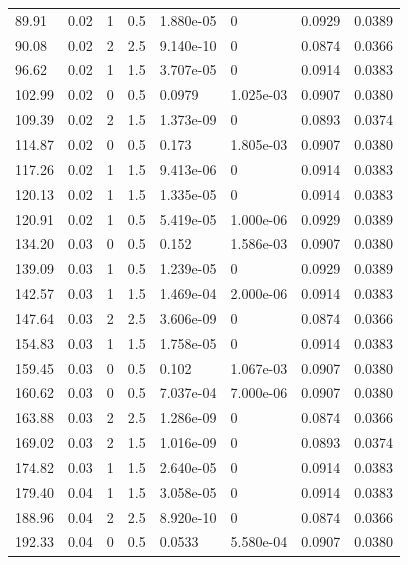 \documentclass[preview]{standalone}
\begin{document}
{{\begin{tabular}{L{1.2cm}C{1.2cm} C{0.3cm}C{0.5cm} C{1.4cm}C{1.4cm} C{1.4cm}C{1.4cm}}
  89.91  &  0.02  & 1     & 0.5 &  1.880e-05  & 0  & 0.0929 &  0.0389   \\ 
  90.08  &  0.02  & 2     & 2.5 &  9.140e-10  & 0  & 0.0874 &  0.0366   \\ 
  96.62  &  0.02  & 1     & 1.5 &  3.707e-05  & 0  & 0.0914 &  0.0383   \\ 
  102.99  &  0.02  & 0     & 0.5 &  0.0979  & 1.025e-03  & 0.0907 &  0.0380   \\ 
  109.39  &  0.02  & 2     & 1.5 &  1.373e-09  & 0  & 0.0893 &  0.0374   \\ 
  114.87  &  0.02  & 0     & 0.5 &  0.173  & 1.805e-03  & 0.0907 &  0.0380   \\ 
  117.26  &  0.02  & 1     & 1.5 &  9.413e-06  & 0  & 0.0914 &  0.0383   \\ 
  120.13  &  0.02  & 1     & 1.5 &  1.335e-05  & 0  & 0.0914 &  0.0383   \\ 
  120.91  &  0.02  & 1     & 0.5 &  5.419e-05  & 1.000e-06  & 0.0929 &  0.0389   \\ 
  134.20  &  0.03  & 0     & 0.5 &  0.152  & 1.586e-03  & 0.0907 &  0.0380   \\ 
  139.09  &  0.03  & 1     & 0.5 &  1.239e-05  & 0  & 0.0929 &  0.0389   \\ 
  142.57  &  0.03  & 1     & 1.5 &  1.469e-04  & 2.000e-06  & 0.0914 &  0.0383   \\ 
  147.64  &  0.03  & 2     & 2.5 &  3.606e-09  & 0  & 0.0874 &  0.0366   \\ 
  154.83  &  0.03  & 1     & 1.5 &  1.758e-05  & 0  & 0.0914 &  0.0383   \\ 
  159.45  &  0.03  & 0     & 0.5 &  0.102  & 1.067e-03  & 0.0907 &  0.0380   \\ 
  160.62  &  0.03  & 0     & 0.5 &  7.037e-04  & 7.000e-06  & 0.0907 &  0.0380   \\ 
  163.88  &  0.03  & 2     & 2.5 &  1.286e-09  & 0  & 0.0874 &  0.0366   \\ 
  169.02  &  0.03  & 2     & 1.5 &  1.016e-09  & 0  & 0.0893 &  0.0374   \\ 
  174.82  &  0.03  & 1     & 1.5 &  2.640e-05  & 0  & 0.0914 &  0.0383   \\ 
  179.40  &  0.04  & 1     & 1.5 &  3.058e-05  & 0  & 0.0914 &  0.0383   \\ 
  188.96  &  0.04  & 2     & 2.5 &  8.920e-10  & 0  & 0.0874 &  0.0366   \\ 
  192.33  &  0.04  & 0     & 0.5 &  0.0533  & 5.580e-04  & 0.0907 &  0.0380   \\ 

\end{tabular}}}
\end{document}
